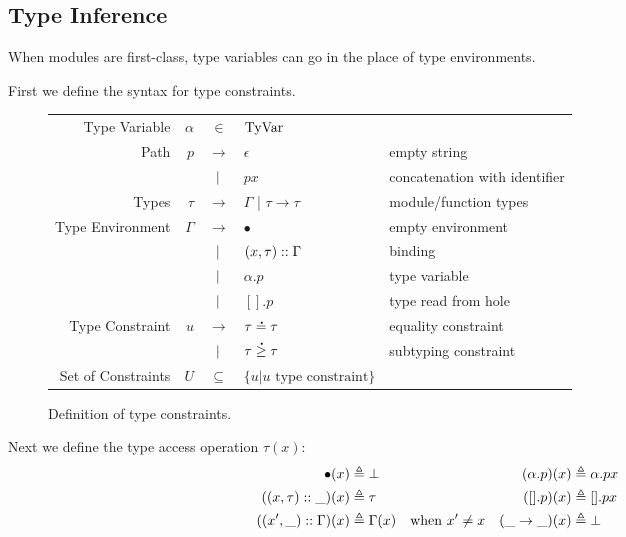 \subsection{Type Inference}

When modules are first-class, type variables can go in the place of type environments.

First we define the syntax for type constraints.
\begin{figure}[h!]
  \centering
  \begin{tabular}{rrcll}
    Type Variable      & $\alpha$ & $\in$         & $\text{TyVar}$                                                         \\
    Path               & $p$      & $\rightarrow$ & $\epsilon$                       & empty string                  \\
                       &          & $|$       & $p x$                            & concatenation with identifier \\
    Types              & $\tau$   & $\rightarrow$ & $\Gamma$ | $\tau\rightarrow\tau$ & module/function types         \\
    Type Environment   & $\Gamma$ & $\rightarrow$ & $\bullet$                        & empty environment             \\
                       &          & $|$       & $(x,\tau):: \Gamma$           & binding                       \\
                       &          & $|$       & $\alpha.p$                       & type variable                 \\
                       &          & $|$       & $[].p$                           & type read from hole           \\
    Type Constraint    & $u$      & $\rightarrow$ & $\tau\overset{\,_{\mbox{\Large .}}}{=}\tau$                  & equality constraint           \\
                       &          & $|$       & $\tau\overset{\,_{\mbox{\Large .}}}{\ge}\tau$                & subtyping constraint          \\
    Set of Constraints & $U$      & $\subseteq$   & $\{u|u\text{ type constraint}\}$
  \end{tabular}
  \caption{Definition of type constraints.}
  \label{fig:typeqdom}
\end{figure}

Next we define the type access operation $\tau(x)$:
\begin{align*}
  \bullet(x)              & \triangleq\bot      &                      &  & (\alpha.p)(x)        & \triangleq\alpha.px \\
  ((x,\tau)::\_)(x)    & \triangleq\tau      &                      &  & ([].p)(x)            & \triangleq[].px     \\
  ((x',\_)::\Gamma)(x) & \triangleq\Gamma(x) & \text{when }x'\neq x &  & (\_\rightarrow\_)(x) & \triangleq\bot
\end{align*}

